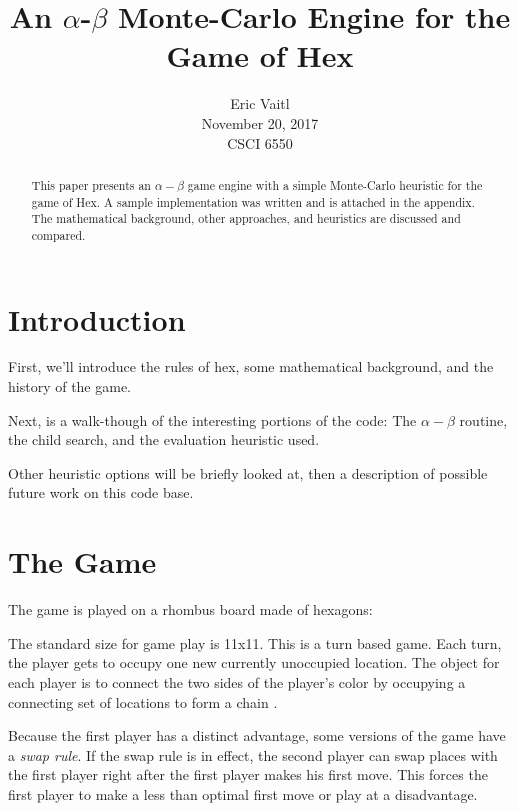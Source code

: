 \documentclass[12pt,titlepage]{amsart}
\title{An $\alpha$-$\beta$ Monte-Carlo Engine for the Game of Hex}
\author{Eric Vaitl\\November 20, 2017\\CSCI 6550}
\begin{document}
\begin{abstract}

    This paper presents an $\alpha-\beta$ game engine with a simple
    Monte-Carlo heuristic for the game of Hex. A sample implementation
    was written and is attached in the appendix. The mathematical
    background, other approaches, and heuristics are discussed and
    compared.

\end{abstract}

\maketitle

\section{Introduction}

First, we'll introduce the rules of hex, some mathematical background, and the
history of the game.

Next, is a walk-though of the interesting portions of the code: The $\alpha-\beta$
routine, the child search, and the evaluation heuristic used.

Other heuristic options will be briefly looked at, then a description
of possible future work on this code base.

\section{The Game}

The game is played on a rhombus board made of hexagons:

\begin{HexBoard}[board size=5]
\end{HexBoard}

The standard size for game play is 11x11.  This is a turn based game. Each turn,
the player gets to occupy one new currently unoccupied location. The object for
each player is to connect the two sides of the player's color by occupying a
connecting set of locations to form a chain \cite{Maarup05}.

Because the first player has a distinct advantage, some versions of
the game have a \emph{swap rule}. If the swap rule is in effect, the
second player can swap places with the first player right after the
first player makes his first move. This forces the first player to
make a less than optimal first move or play at a disadvantage.
\end{document}
